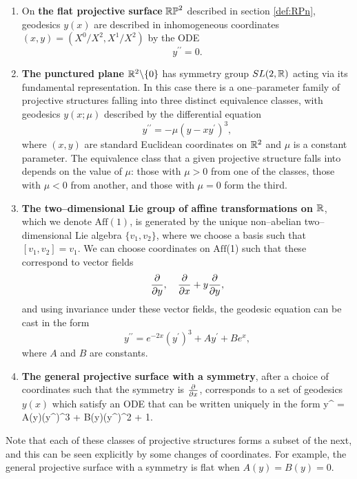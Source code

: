 \begin{enumerate}
\item On {\bf the flat projective surface} $\mathbb{RP}^2$ described in section \ref{def:RPn}, geodesics $y(x)$ are described in inhomogeneous coordinates $(x,y)=({X^0}/{X^2},{X^1}/{X^2})$ by the ODE
\[
y^{\prime\prime}=0.
\]
\item {\bf The punctured plane $\mathbb{R}^2\backslash\{0\}$} has symmetry group $SL(2,\mathbb{R})$ acting via its fundamental representation. In this case there is a one--parameter family of projective structures falling into three distinct equivalence classes, with geodesics $y(x;\mu)$ described by the differential equation
\[
y^{\prime\prime} = -\mu(y-xy^\prime)^3,
\]
where $(x,y)$ are standard Euclidean coordinates on $\mathbb{R}^2$ and $\mu$ is a constant parameter. The equivalence class that a given projective structure falls into depends on the value of $\mu$: those with $\mu>0$ from one of the classes, those with $\mu<0$ from another, and those with $\mu=0$ form the third. 
\item {\bf The two--dimensional Lie group of affine transformations on $\mathbb{R}$}, which we denote $\mathrm{Aff}(1)$, is generated by the unique non--abelian two--dimensional Lie algebra $\{v_1,v_2\}$, where we choose a basis such that $[v_1,v_2]=v_1$. We can choose coordinates on $\mathrm{Aff}$(1) such that these correspond to vector fields
\[
\frac{\partial}{\partial y},\quad \frac{\partial}{\partial x} + y\frac{\partial}{\partial y},
\]
and using invariance under these vector fields, the geodesic equation can be cast in the form \cite{FLL}
\[
y^{\prime\prime} = e^{-2x}(y^\prime)^3 + Ay^\prime + Be^x,
\]
where $A$ and $B$ are constants.
\item {\bf The general projective surface with a symmetry}, after a choice of coordinates such that the symmetry is $\frac{\partial}{\partial x}$, corresponds to a set of geodesics $y(x)$ which satisfy an ODE that can be written uniquely in the form \cite{FLL}
\be \label{eq:1symode}
y^{\prime\prime} = A(y)(y^\prime)^3 + B(y)(y^\prime)^2 + 1.
\ee
\end{enumerate}

Note that each of these classes of projective structures forms a subset of the next, and this can be seen explicitly by some changes of coordinates. For example, the general projective surface with a symmetry is flat when $A(y)=B(y)=0$.

